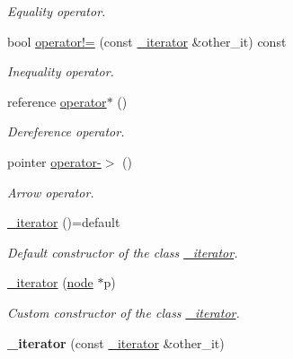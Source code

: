 \begin{DoxyCompactItemize}
\begin{DoxyCompactList}\small\item\em Equality operator. \end{DoxyCompactList}\item 
bool \hyperlink{classbst_1_1__iterator_a686ce4f61f2b00e175e68c0946f3343b}{operator!=} (const \hyperlink{classbst_1_1__iterator}{\+\_\+iterator} \&other\+\_\+it) const
\begin{DoxyCompactList}\small\item\em Inequality operator. \end{DoxyCompactList}\item 
reference \hyperlink{classbst_1_1__iterator_a2c9b9c771a694c86fa380a461cde102d}{operator$\ast$} ()
\begin{DoxyCompactList}\small\item\em Dereference operator. \end{DoxyCompactList}\item 
pointer \hyperlink{classbst_1_1__iterator_ab0600ef918d7840c080a7dab0e43d8cd}{operator-\/$>$} ()
\begin{DoxyCompactList}\small\item\em Arrow operator. \end{DoxyCompactList}\item 
\mbox{\label{classbst_1_1__iterator_aee835330729dd908efe42460525aa057}} 
\hyperlink{classbst_1_1__iterator_aee835330729dd908efe42460525aa057}{\+\_\+iterator} ()=default
\begin{DoxyCompactList}\small\item\em Default constructor of the class \hyperlink{classbst_1_1__iterator}{\+\_\+iterator}. \end{DoxyCompactList}\item 
\hyperlink{classbst_1_1__iterator_a9c4c33751d4d0a8484855b48acd730a2}{\+\_\+iterator} (\hyperlink{structbst_1_1node}{node} $\ast$p)
\begin{DoxyCompactList}\small\item\em Custom constructor of the class \hyperlink{classbst_1_1__iterator}{\+\_\+iterator}. \end{DoxyCompactList}\item 
\mbox{\label{classbst_1_1__iterator_af8bcb6d89d905c49392114d839dd3fcd}} 
{\bfseries \+\_\+iterator} (const \hyperlink{classbst_1_1__iterator}{\+\_\+iterator} \&other\+\_\+it)
\item 

\end{DoxyCompactItemize}
